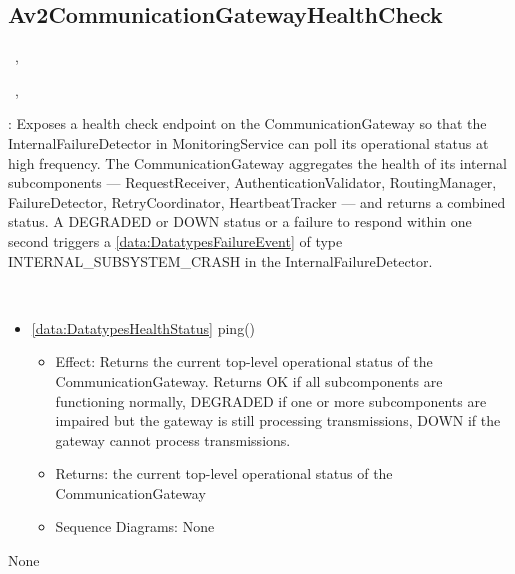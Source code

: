   \subsection{Av2CommunicationGatewayHealthCheck}\label{int:InterfacesAv2CommunicationGatewayHealthCheck}
    \begin{description}
      \item[Provided by:] \iconcomponent{}~, \iconcomponent{}~
      \item[Required by:] \iconcomponent{}~, \iconcomponent{}~ 
           \item[Description]: Exposes a health check endpoint on the CommunicationGateway so that the InternalFailureDetector in MonitoringService can poll its operational status at high frequency. The CommunicationGateway aggregates the health of its internal subcomponents — RequestReceiver, AuthenticationValidator, RoutingManager, FailureDetector, RetryCoordinator, HeartbeatTracker — and returns a combined status. A DEGRADED or DOWN status or a failure to respond within one second triggers a \ref{data:DatatypesFailureEvent} of type INTERNAL\_SUBSYSTEM\_CRASH in the InternalFailureDetector.
      \item[Operations:] ~
    \begin{itemize}[noitemsep,nolistsep,leftmargin=-.25cm]
      \item \textsf{\ref{data:DatatypesHealthStatus} ping()}
        \begin{itemize}[noitemsep,nolistsep]
           \item Effect: Returns the current top-level operational status of the CommunicationGateway. Returns OK if all subcomponents are functioning normally, DEGRADED if one or more subcomponents are impaired but the gateway is still processing transmissions, DOWN if the gateway cannot process transmissions. 
           \item Returns: the current top-level operational status of the CommunicationGateway
           \item Sequence Diagrams: None
        \end{itemize}
    \end{itemize}
      \item[Diagrams:] None
    \end{description}

